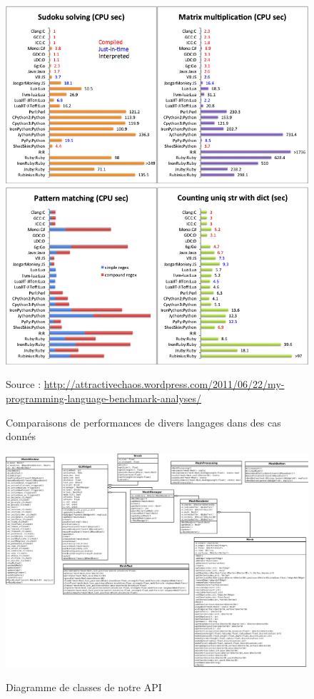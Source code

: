 \documentclass[a4paper]{memoir}
\begin{document}
			\begin{figure}
				\begin{center}
					\includegraphics[scale=0.5]{img/AnalyseLangage1.png}
					\includegraphics[scale=0.5]{img/AnalyseLangage2.png} 
				\end{center}
				\label{fig:analyse}
				\caption{Comparaisons de performances de divers langages dans des cas donnés}
				Source : \url{http://attractivechaos.wordpress.com/2011/06/22/my-programming-language-benchmark-analyses/}
			\end{figure}
			
			\begin{figure}
					\hspace{-5cm}\includegraphics{img/diagClass.png}
				\label{fig:diagClass}
				\caption{Diagramme de classes de notre API}
			\end{figure}
			
\end{document}
